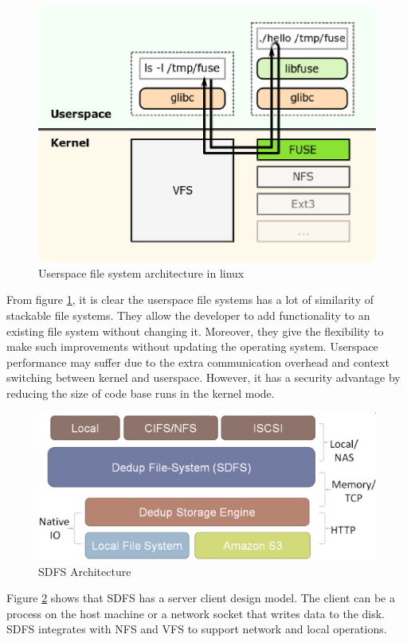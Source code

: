 \begin{figure}
\begin{center}
\includegraphics[scale=.55]{FUSE.eps}
\caption{Userspace file system architecture in linux\cite{web:wiki-fuse}}
\label{fig:fuse}
\end{center}
\end{figure}
\newline\newline
\noindent From figure \ref{fig:fuse}, it is clear the userspace file systems has a lot of similarity of stackable file systems. They allow the developer
to add functionality to an existing file system without changing it. Moreover, they give the flexibility to make such improvements without 
updating the operating system. Userspace performance may suffer due to the extra communication overhead and context switching between kernel and userspace.
However, it has a security advantage by reducing the size of code base runs in the kernel mode.

\begin{figure}[H]
\begin{center}
\includegraphics[scale=0.30]{sdfs_arch.eps}
\caption{SDFS Architecture\cite{web:opendedup}}
\label{fig:sdfsarch}
\end{center}
\end{figure}

\noindent Figure \ref{fig:sdfsarch} shows that SDFS has a server client design model. The client can be a process on the host machine or a network socket that
writes data to the disk. SDFS integrates with NFS and VFS to support network and local operations. 

